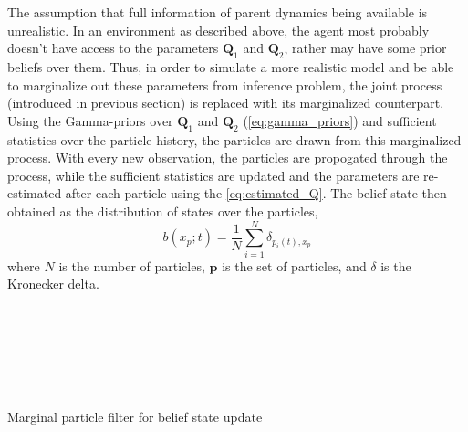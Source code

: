 The assumption that full information of parent dynamics being available is unrealistic. In an environment as described above, the agent most probably doesn't have access to the parameters $ \textbf{Q}_1 $ and $ \textbf{Q}_2 $, rather may have some prior beliefs over them. Thus, in order to simulate a more realistic model and be able to marginalize out these parameters from inference problem, the joint process (introduced in previous section) is replaced with its marginalized counterpart. Using the Gamma-priors over $ \textbf{Q}_1 $ and $ \textbf{Q}_2 $ (\autoref{eq:gamma_priors}) and sufficient statistics over the particle history, the particles are drawn from this marginalized process. With every new observation, the particles are propogated through the process, while the sufficient statistics are updated and the parameters are re-estimated after each particle using the \autoref{eq:estimated_Q}. The belief state then obtained as the distribution of states over the particles,
\begin{equation}
b(x_p; t) = \frac{1}{N} \sum_{i=1}^{N} \delta_{p_i(t), x_p}
\end{equation}
where $ N $ is the number of particles, $ \textbf{p} $ is the set of particles, and $\delta$ is the Kronecker delta.

\begin{algorithm}[H]
	
	\vspace{+4pt}
	\begin{algorithmic}[1]
		\\
		
		 \\
		\ENDFOR \\
		\\
		\\
		\ENDFOR 
	\end{algorithmic}
	\caption{Marginal particle filter for belief state update}
\end{algorithm}

